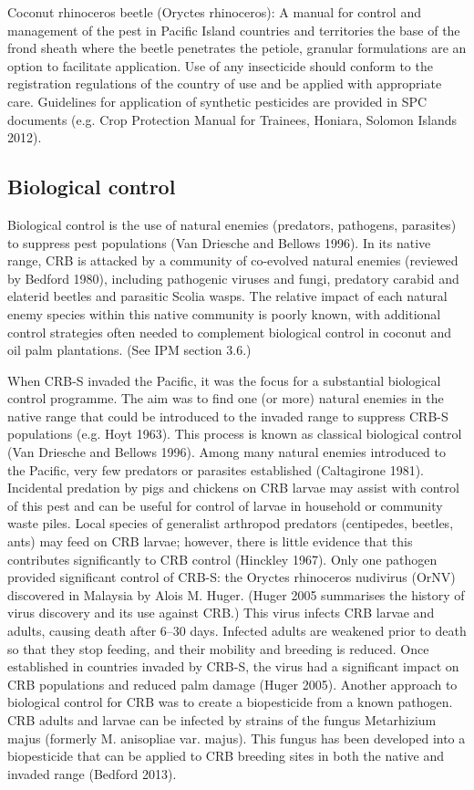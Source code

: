 \documentclass[twocolumn,letterpaper]{scrartcl}
\begin{document}
Coconut rhinoceros beetle (Oryctes rhinoceros): A manual for control and management of the pest in Pacific Island countries and territoriesthe base of the frond sheath where the beetle penetrates the petiole, granular formulations are an option to 
facilitate application. Use of any insecticide should conform to the registration regulations of the country of 
use and be applied with appropriate care. Guidelines for application of synthetic pesticides are provided in SPC 
documents (e.g. Crop Protection Manual for Trainees, Honiara, Solomon Islands 2012).

\subsection{Biological control}
 
Biological control is the use of natural enemies (predators, pathogens, parasites) to suppress pest populations 
(Van Driesche and Bellows 1996). In its native range, CRB is attacked by a community of co-evolved natural 
enemies (reviewed by Bedford 1980), including pathogenic viruses and fungi, predatory carabid and elaterid 
beetles  and  parasitic  Scolia  wasps.  The  relative  impact  of  each  natural  enemy  species  within  this  native 
community is poorly known, with additional control strategies often needed to complement biological control 
in coconut and oil palm plantations. (See IPM section 3.6.)

When  CRB-S  invaded  the  Pacific,  it  was  the  focus  for  a  substantial  biological  control  programme.  The  aim 
was to find one (or more) natural enemies in the native range that could be introduced to the invaded range 
to  suppress  CRB-S  populations  (e.g.  Hoyt  1963).  This  process  is  known  as  classical  biological  control  (Van 
Driesche and Bellows 1996). Among many natural enemies introduced to the Pacific, very few predators or 
parasites established (Caltagirone 1981). Incidental predation by pigs and chickens on CRB larvae may assist 
with control of this pest and can be useful for control of larvae in household or community waste piles. Local 
species of generalist arthropod predators (centipedes, beetles, ants) may feed on CRB larvae; however, there is 
little evidence that this contributes significantly to CRB control (Hinckley 1967). Only one pathogen provided 
significant control of CRB-S: the Oryctes rhinoceros nudivirus (OrNV) discovered in Malaysia by Alois M. Huger. 
(Huger 2005 summarises the history of virus discovery and its use against CRB.) This virus infects CRB larvae and 
adults, causing death after 6–30 days. Infected adults are weakened prior to death so that they stop feeding, 
and their mobility and breeding is reduced. Once established in countries invaded by CRB-S, the virus had a 
significant impact on CRB populations and reduced palm damage (Huger 2005). Another approach to biological 
control for CRB was to create a biopesticide from a known pathogen. CRB adults and larvae can be infected by 
strains of the fungus Metarhizium majus (formerly M. anisopliae var. majus). This fungus has been developed into 
a biopesticide that can be applied to CRB breeding sites in both the native and invaded range (Bedford 2013). 
\end{document}
